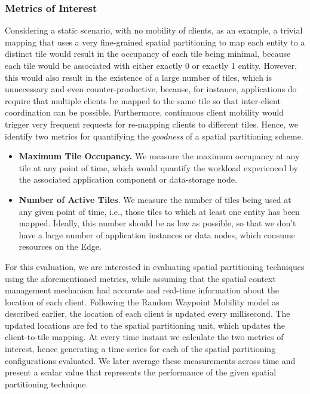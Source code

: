 \subsubsection{Metrics of Interest}
Considering a static scenario, with no mobility of clients, as an example, a trivial mapping that uses a very fine-grained spatial partitioning to map each entity to a distinct tile would result in the occupancy of each tile being minimal, because each tile would be associated with either exactly 0 or exactly 1 entity. However, this would also result in the existence of a large number of tiles, which is unnecessary and even counter-productive, because, for instance, applications do require that multiple clients be mapped to the same tile so that inter-client coordination can be possible. Furthermore, continuous client mobility would trigger very frequent requests for re-mapping clients to different tiles. Hence, we identify two metrics for quantifying the \textit{goodness} of a spatial partitioning scheme. 
\begin{itemize}
\item \textbf{Maximum Tile Occupancy.} We measure the maximum occupancy at any tile at any point of time, which would quantify the workload experienced by the associated application component or data-storage node. 
\item \textbf{Number of Active Tiles}. We measure the number of tiles being used at any given point of time, i.e., those tiles to which at least one entity has been mapped. Ideally, this number should be as low as possible, so that we don't have a large number of application instances or data nodes, which consume resources on the Edge.
\end{itemize}
\par For this evaluation, we are interested in evaluating spatial partitioning techniques using the aforementioned metrics, while assuming that the spatial context management mechanism had accurate and real-time information about the location of each client. Following the Random Waypoint Mobility model as described earlier, the location of each client is updated every millisecond. The updated locations are fed to the spatial partitioning unit, which updates the client-to-tile mapping. At every time instant we calculate the two metrics of interest, hence generating a time-series for each of the spatial partitioning configurations evaluated. We later average these measurements across time and present a scalar value that represents the performance of the given spatial partitioning technique.

